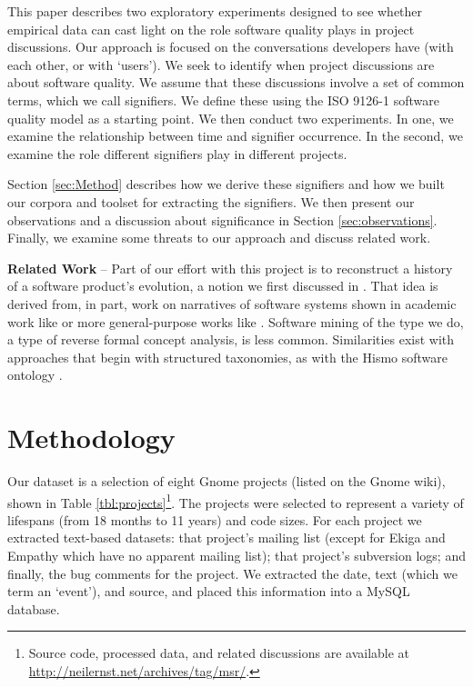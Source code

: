 \documentclass[conference, compsoc]{IEEEtran}
\begin{document}
This paper describes two exploratory experiments designed to see whether empirical data can cast light on the role software quality plays in project discussions. Our approach is focused on the conversations developers have (with each other, or with `users'). We seek to identify when project discussions are about software quality. We assume that these discussions involve a set of common terms, which we call signifiers. We define these using the ISO 9126-1 software quality model \cite{iso9126} as a starting point. We then conduct two experiments. In one, we examine the relationship between time and signifier occurrence. In the second, we examine the role different signifiers play in different projects. 
	
Section \ref{sec:Method} describes how we derive these signifiers and how we built our corpora and toolset for extracting the signifiers. We then present our observations and a discussion about significance in Section \ref{sec:observations}. Finally, we examine some threats to our approach and discuss related work. 

\noindent\textbf{Related Work} -- Part of our effort with this project is to reconstruct a history of a software product's evolution, a notion we first discussed in \cite{Ernst07icsm}. That idea is derived from, in part, work on narratives of software systems shown in academic work like \cite{Anton2001} or more general-purpose works like \cite{waldo93}. Software mining of the type we do, a type of reverse formal concept analysis, is less common. Similarities exist with approaches that begin with structured taxonomies, as with the Hismo software ontology \cite{Girba2006}.
	
\vspace{-2mm}
\section{Methodology}
\vspace{-2mm}
\label{sec:Method}
Our dataset is a selection of eight Gnome projects (listed on the Gnome wiki), shown in Table \ref{tbl:projects}\footnote{Source code, processed data, and related discussions are available at \url{http://neilernst.net/archives/tag/msr/}.}. The projects were selected to represent a variety of lifespans (from 18 months to 11 years) and code sizes. For each project we extracted text-based datasets: that project's mailing list (except for Ekiga and Empathy which have no apparent mailing list); that project's subversion logs; and finally, the bug comments for the project. We extracted the date, text (which we term an `event'), and source, and placed this information into a MySQL database.
\end{document}
